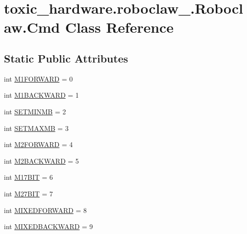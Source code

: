 \hypertarget{classtoxic__hardware_1_1roboclaw__3_1_1Roboclaw_1_1Cmd}{}\section{toxic\+\_\+hardware.\+roboclaw\+\_.\+Roboclaw.\+Cmd Class Reference}
\label{classtoxic__hardware_1_1roboclaw__3_1_1Roboclaw_1_1Cmd}
\subsection*{Static Public Attributes}
\begin{DoxyCompactItemize}
\item 
int \mbox{\hyperlink{classtoxic__hardware_1_1roboclaw__3_1_1Roboclaw_1_1Cmd_ae5accf3bc2c56d72ca0289c1dce128ee}{M1\+F\+O\+R\+W\+A\+RD}} = 0
\item 
int \mbox{\hyperlink{classtoxic__hardware_1_1roboclaw__3_1_1Roboclaw_1_1Cmd_a3241dfbf5bf96fe738634e01f3b868ec}{M1\+B\+A\+C\+K\+W\+A\+RD}} = 1
\item 
int \mbox{\hyperlink{classtoxic__hardware_1_1roboclaw__3_1_1Roboclaw_1_1Cmd_adba4d514b4ab2836e445dc7234bd5bad}{S\+E\+T\+M\+I\+N\+MB}} = 2
\item 
int \mbox{\hyperlink{classtoxic__hardware_1_1roboclaw__3_1_1Roboclaw_1_1Cmd_ad34cb54dffa4b49e57531dd3ed63e4dd}{S\+E\+T\+M\+A\+X\+MB}} = 3
\item 
int \mbox{\hyperlink{classtoxic__hardware_1_1roboclaw__3_1_1Roboclaw_1_1Cmd_acc8e7439e46550fb950f655157d3b2a3}{M2\+F\+O\+R\+W\+A\+RD}} = 4
\item 
int \mbox{\hyperlink{classtoxic__hardware_1_1roboclaw__3_1_1Roboclaw_1_1Cmd_aa32b5d8a1015b99fca827fe4bd8be6e5}{M2\+B\+A\+C\+K\+W\+A\+RD}} = 5
\item 
int \mbox{\hyperlink{classtoxic__hardware_1_1roboclaw__3_1_1Roboclaw_1_1Cmd_a7a91fb3913901579ee02798b3798fab4}{M17\+B\+IT}} = 6
\item 
int \mbox{\hyperlink{classtoxic__hardware_1_1roboclaw__3_1_1Roboclaw_1_1Cmd_ab63803cd2aa9d31d0b0094fe5c1f26a1}{M27\+B\+IT}} = 7
\item 
int \mbox{\hyperlink{classtoxic__hardware_1_1roboclaw__3_1_1Roboclaw_1_1Cmd_adc14d33d7da1b268c717bd3e33cf1606}{M\+I\+X\+E\+D\+F\+O\+R\+W\+A\+RD}} = 8
\item 
int \mbox{\hyperlink{classtoxic__hardware_1_1roboclaw__3_1_1Roboclaw_1_1Cmd_a1d644819677b9fdc425b826e0296aa40}{M\+I\+X\+E\+D\+B\+A\+C\+K\+W\+A\+RD}} = 9

\end{DoxyCompactItemize}

